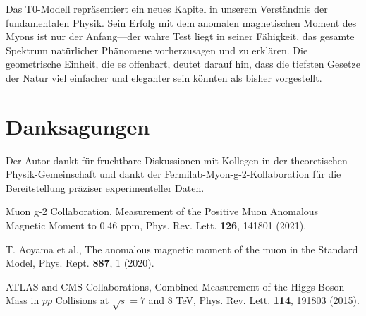\documentclass[12pt,a4paper]{article}
\begin{document}
\begin{tcolorbox}[colback=blue!5!white,colframe=blue!75!black,title=Blick nach vorn]
Das T0-Modell repräsentiert ein neues Kapitel in unserem Verständnis der fundamentalen Physik. Sein Erfolg mit dem anomalen magnetischen Moment des Myons ist nur der Anfang—der wahre Test liegt in seiner Fähigkeit, das gesamte Spektrum natürlicher Phänomene vorherzusagen und zu erklären. Die geometrische Einheit, die es offenbart, deutet darauf hin, dass die tiefsten Gesetze der Natur viel einfacher und eleganter sein könnten als bisher vorgestellt.
\end{tcolorbox}

\section{Danksagungen}

Der Autor dankt für fruchtbare Diskussionen mit Kollegen in der theoretischen Physik-Gemeinschaft und dankt der Fermilab-Myon-g-2-Kollaboration für die Bereitstellung präziser experimenteller Daten.

\begin{thebibliography}{99}

Muon g-2 Collaboration, Measurement of the Positive Muon Anomalous Magnetic Moment to 0.46 ppm, Phys. Rev. Lett. \textbf{126}, 141801 (2021).

T. Aoyama et al., The anomalous magnetic moment of the muon in the Standard Model, Phys. Rept. \textbf{887}, 1 (2020).

ATLAS and CMS Collaborations, Combined Measurement of the Higgs Boson Mass in $pp$ Collisions at $\sqrt{s} = 7$ and 8 TeV, Phys. Rev. Lett. \textbf{114}, 191803 (2015).

\end{thebibliography}
\end{document}
